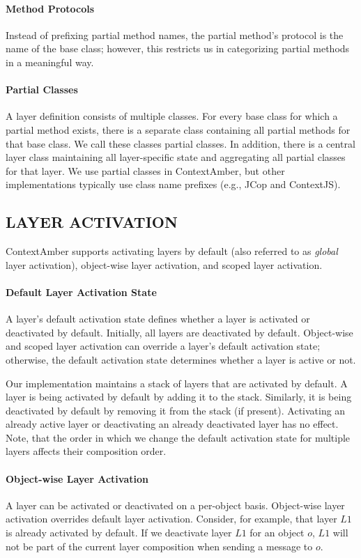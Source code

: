 \documentclass[english,paper=a4,twocolumn=true,DIV=calc,fontsize=9pt]{scrartcl}
\begin{document}
\paragraph{Method Protocols}
Instead of prefixing partial method names, the partial method's protocol is the name of the base class; however, this restricts us in categorizing partial methods in a meaningful way.

\paragraph{Partial Classes}
A layer definition consists of multiple classes. For every base class for which a partial method exists, there is a separate class containing all partial methods for that base class. We call these classes partial classes. In addition, there is a central layer class maintaining all layer-specific state and aggregating all partial classes for that layer. We use partial classes in ContextAmber, but other implementations typically use class name prefixes (e.g., JCop and ContextJS).

\subsection{LAYER ACTIVATION}
ContextAmber supports activating layers by default (also referred to as \emph{global} layer activation), object-wise layer activation, and scoped layer activation.

\paragraph{Default Layer Activation State}
A layer's default activation state defines whether a layer is activated or deactivated by default. Initially, all layers are deactivated by default. Object-wise and scoped layer activation can override a layer's default activation state; otherwise, the default activation state determines whether a layer is active or not. 

Our implementation maintains a stack of layers that are activated by default. A layer is being activated by default by adding it to the stack. Similarly, it is being deactivated by default by removing it from the stack (if present). Activating an already active layer or deactivating an already deactivated layer has no effect. Note, that the order in which we change the default activation state for multiple layers affects their composition order.

\paragraph{Object-wise Layer Activation}
A layer can be activated or deactivated on a per-object basis. Object-wise layer activation overrides default layer activation. Consider, for example, that layer $L1$ is already activated by default. If we deactivate layer $L1$ for an object $o$, $L1$ will not be part of the current layer composition when sending a message to $o$.
\end{document}
